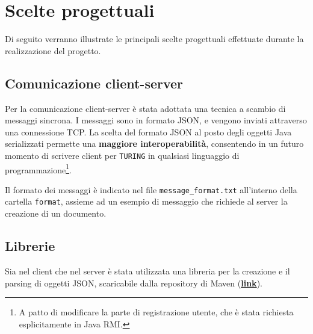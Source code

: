 \section{Scelte progettuali}
Di seguito verranno illustrate le principali scelte progettuali effettuate durante la realizzazione del progetto.





\subsection{Comunicazione client-server}
Per la comunicazione client-server è stata adottata una tecnica a scambio di messaggi sincrona. I messaggi sono in formato JSON, e vengono inviati attraverso una connessione TCP. La scelta del formato JSON al posto degli oggetti Java serializzati permette una \textbf{maggiore interoperabilità}, consentendo in un futuro momento di scrivere client per \texttt{TURING} in qualsiasi linguaggio di programmazione\footnote{A patto di modificare la parte di registrazione utente, che è stata richiesta esplicitamente in Java RMI.}.

\medskip

Il formato dei messaggi è indicato nel file \texttt{message\_format.txt} all'interno della cartella \texttt{format}, assieme ad un esempio di messaggio che richiede al server la creazione di un documento.

\subsection{Librerie}
Sia nel client che nel server è stata utilizzata una libreria per la creazione e il parsing di oggetti JSON, scaricabile dalla repository di Maven (\href{https://mvnrepository.com/artifact/org.json/json}{\textbf{link}}).
